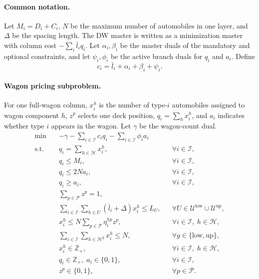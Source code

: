 \paragraph{Common notation.}
Let \(M_i=D_i+C_i\), \(N\) be the maximum number of automobiles in one layer, and \(\Delta\) be the spacing length.  The DW master is written as a minimization master with column cost \(-\sum_i \bar l_i q_i\).  Let \(\alpha_i,\beta_i\) be the master duals of the mandatory and optional constraints, and let \(\psi_i,\phi_i\) be the active branch duals for \(q_i\) and \(a_i\).  Define
\[
c_i=\bar l_i+\alpha_i+\beta_i+\psi_i .
\]

\paragraph{Wagon pricing subproblem.}
For one full-wagon column, \(x_i^h\) is the number of type-\(i\) automobiles assigned to wagon component \(h\), \(z^p\) selects one deck position, \(q_i=\sum_h x_i^h\), and \(a_i\) indicates whether type \(i\) appears in the wagon.  Let \(\gamma\) be the wagon-count dual.
\begin{align}
\min \quad & -\gamma-\sum_{i\in\mathcal I} c_i q_i-\sum_{i\in\mathcal I}\phi_i a_i \\
\text{s.t.}\quad & q_i=\sum_{h\in\mathcal H}x_i^h, &&\forall i\in\mathcal I,\\
& q_i\le M_i, &&\forall i\in\mathcal I,\\
& q_i\le 2N a_i, &&\forall i\in\mathcal I,\\
& q_i\ge a_i, &&\forall i\in\mathcal I,\\
& \sum_{p\in\mathcal P}z^p=1,\\
& \sum_{i\in\mathcal I}\sum_{h\in U}(\bar l_i+\Delta)x_i^h\le L_U, &&\forall U\in\mathcal U^{\mathrm{low}}\cup\mathcal U^{\mathrm{up}},\\
& x_i^h\le N\sum_{p\in\mathcal P}\eta_i^{hp}z^p, &&\forall i\in\mathcal I,\;h\in\mathcal H,\\
& \sum_{i\in\mathcal I}\sum_{h\in\mathcal H^g}x_i^h\le N, &&\forall g\in\{\mathrm{low},\mathrm{up}\},\\
& x_i^h\in\mathbb Z_+, &&\forall i\in\mathcal I,\;h\in\mathcal H,\\
& q_i\in\mathbb Z_+,\;a_i\in\{0,1\}, &&\forall i\in\mathcal I,\\
& z^p\in\{0,1\}, &&\forall p\in\mathcal P.
\end{align}

